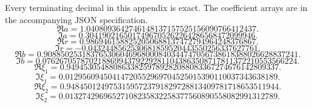 Every terminating decimal in this appendix is exact. The coefficient arrays are in the accompanying JSON specification.
\begingroup\small
\[\Re a=1.0408093642746148137157525156090766412437.\]
\[\Im a=0.3041902165017496705262264286568472099946.\]
\[\Re r=0.9869461588252050688137472794964248376867.\]
\[\Im r=-0.0432448562530681859520443550256337627761.\]
\[\Re b=0.908850253183765306046968000840344747056738618388026628837241.\]
\[\Im b=0.076267057870218869943792292811043863508717811372210553566224.\]
\[\Re\xi_1=0.94945305488086338259789282088083367274676142809337.\]
\[\Im\xi_1=0.01295609450414720552969704525015390110037343638189.\]
\[\Re\xi_2=0.94845012497531595723791829728813409781718653511944.\]
\[\Im\xi_2=0.01327429696527108235832258377560890558082991312789.\]
\endgroup
